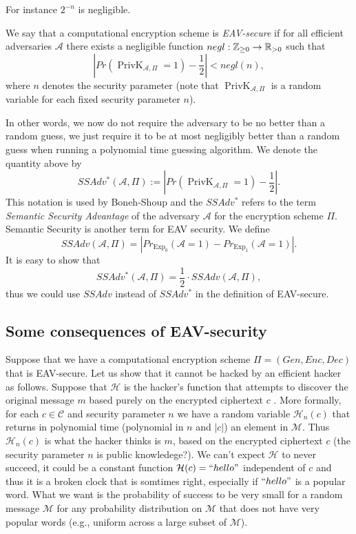 \documentclass[twoside, a4paper, 10pt]{amsart}
\begin{document}
For instance $2^{-n}$ is negligible.

\begin{mydef} We say that a computational encryption scheme is \textit{EAV-secure} if for all efficient adversaries $\mathcal{A}$ there exists a negligible function $negl:\mathbb{Z}_{\geq 0} \to \mathbb{R}_{>0}$ such that $$\left | Pr(\operatorname{PrivK}_{\mathcal{A}, \Pi} = 1) - \frac{1}{2} \right | < negl(n), $$ where $n$ denotes the security parameter (note that $\operatorname{PrivK}_{\mathcal{A}, \Pi}$ is a random variable for each fixed security parameter $n$).

\end{mydef}

In other words, we now do not require the adversary to be no better than a random guess, we just require it to be at most negligibly better than a random guess when running a polynomial time guessing algorithm. We denote the quantity above by  $$SSAdv^*(\mathcal{A}, \Pi) := \left | Pr(\operatorname{PrivK}_{\mathcal{A}, \Pi} = 1) - \frac{1}{2} \right |.$$ This notation is used by Boneh-Shoup and the $SSAdv^*$ refers to the term \textit{Semantic Security Advantage} of the adversary $\mathcal{A}$ for the encryption scheme $\Pi$. Semantic Security is another term for EAV security. We define $$SSAdv(\mathcal{A}, \Pi) = \left | Pr_{\operatorname{Exp}_0}(\mathcal{A} = 1) - Pr_{\operatorname{Exp}_1}(\mathcal{A} = 1) \right |. $$ It is easy to show that $$SSAdv^*(\mathcal{A}, \Pi) = \frac{1}{2} \cdot SSAdv(\mathcal{A}, \Pi),$$ thus we could use $SSAdv$ instead of $SSAdv^*$ in the definition of EAV-secure.

\subsection{Some consequences of EAV-security}

Suppose that we have a computational encryption scheme $\Pi = (Gen, Enc, Dec)$ that is EAV-secure. Let us show that it cannot be hacked by an efficient hacker as follows. Suppose that $\mathcal{H}$ is the hacker's function that attempts to discover the original message $m$ based purely on the encrypted ciphertext $c$ . More formally, for each $c \in \mathcal{C}$ and security parameter $n$ we have a random variable $\mathcal{H}_n(c)$ that returns in polynomial time (polynomial in $n$ and $|c|$) an element in $\mathcal{M}$. Thus $\mathcal{H}_n(c)$ is what the hacker thinks is $m$, based on the encrypted ciphertext $c$ (the security parameter $n$ is public knowledege?). We can't expect $\mathcal{H}$ to never succeed, it could be a constant function $\mathcal{H}(c) = ``hello"$ independent of $c$ and thus it is a broken clock that is somtimes right, especially if $``hello"$ is a popular word. What we want is the probability of success to be very small for a random message $\mathcal{M}$ for any probability distribution on $\mathcal{M}$ that does not have very popular words (e.g., uniform across a large subset of $\mathcal{M}$).
\end{document}
